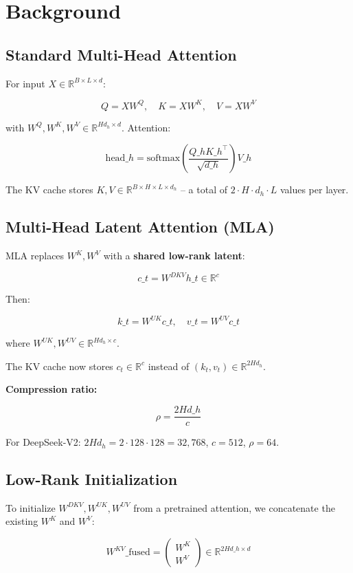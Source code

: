
\section{Background}

\subsection{Standard Multi-Head Attention}

For input $X \in \mathbb{R}^{B \times L \times d}$:

\[
Q = X W^Q, \quad K = X W^K, \quad V = X W^V
\tag{3.1}
\]

with $W^Q, W^K, W^V \in \mathbb{R}^{H d_h \times d}$. Attention:

\[
\text{head}\_h = \text{softmax}\!\left(\frac{Q\_h K\_h^\top}{\sqrt{d\_h}}\right) V\_h
\tag{3.2}
\]

The KV cache stores $K, V \in \mathbb{R}^{B \times H \times L \times d_h}$ -- 
a total of $2 \cdot H \cdot d_h \cdot L$ values per layer.

\subsection{Multi-Head Latent Attention (MLA)}

MLA replaces $W^K, W^V$ with a \textbf{shared low-rank latent}:

\[
c\_t = W^{DKV} h\_t \in \mathbb{R}^c
\tag{3.3}
\]

Then:

\[
k\_t = W^{UK} c\_t, \quad v\_t = W^{UV} c\_t
\tag{3.4}
\]

where $W^{UK}, W^{UV} \in \mathbb{R}^{H d_h \times c}$.

The KV cache now stores $c_t \in \mathbb{R}^c$ instead of $(k_t, v_t) \in \mathbb{R}^{2 H d_h}$.

\textbf{Compression ratio:}

\[
\rho = \frac{2 H d\_h}{c}
\tag{3.5}
\]

For DeepSeek-V2: $2 H d_h = 2 \cdot 128 \cdot 128 = 32{,}768$, $c = 512$, 
$\rho = 64$.

\subsection{Low-Rank Initialization}

To initialize $W^{DKV}, W^{UK}, W^{UV}$ from a pretrained attention, we 
concatenate the existing $W^K$ and $W^V$:

\[
W^{KV}\_\text{fused} = \begin{pmatrix} W^K \\ W^V \end{pmatrix} \in \mathbb{R}^{2 H d\_h \times d}
\tag{3.6}
\]

